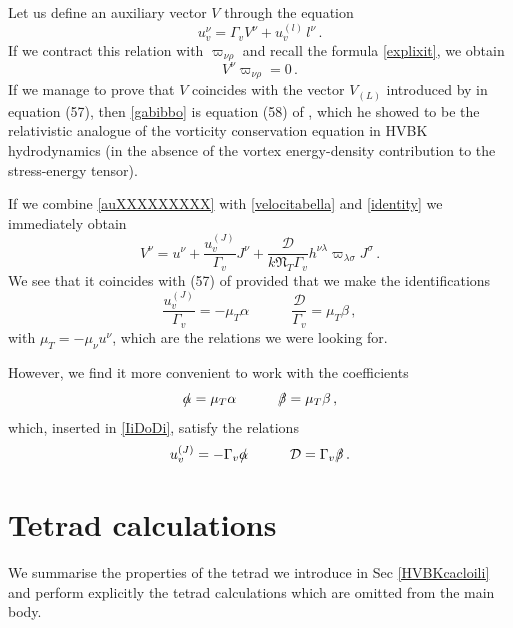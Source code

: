 \documentclass[preprints,article,accept,moreauthors,pdftex]{mdpi}
\newcommand{\spc}{\quad \quad \quad}
\begin{document}
Let us define an auxiliary vector $V$ through the equation
\begin{equation}\label{auXXXXXXXXX}
u_v^\nu = \Gamma_v V^\nu +u_v^{(l)} \, l^\nu \, .
\end{equation}
If we contract this relation with $\varpi_{\nu \rho}$ and recall the formula \eqref{explixit}, we obtain
\begin{equation}\label{gabibbo}
V^\nu \varpi_{\nu \rho} =0 \, .
\end{equation}
If we manage to prove that $V$ coincides with the vector $V_{(L)}$ introduced by \citet{GusakovHVBK} in equation (57), then \eqref{gabibbo} is equation (58) of \cite{GusakovHVBK}, which he showed to be the relativistic analogue of the vorticity conservation equation in HVBK hydrodynamics (in the absence of the vortex energy-density contribution to the stress-energy tensor). 

If we combine \eqref{auXXXXXXXXX} with \eqref{velocitabella} and \eqref{identity} we immediately obtain
\begin{equation}
V^\nu = u^\nu + \dfrac{u_v^{(J)}}{\Gamma_v} J^\nu + \dfrac{\mathcal{D}}{k\mathfrak{N}_T \Gamma_v} h^{\nu \lambda} \varpi_{\lambda \sigma} J^\sigma \, . 
\end{equation}
We see that it coincides with (57) of \cite{GusakovHVBK} provided that we make the identifications
\begin{equation}\label{IiDoDi}
\dfrac{u_v^{(J)}}{\Gamma_v} = - \mu_T  \alpha  \spc   \dfrac{\mathcal{D}}{ \Gamma_v} = \mu_T \beta \, ,
\end{equation}
with $\mu_T =-\mu_\nu u^\nu$, which are the relations we were looking for. 


However, we find it more convenient to work with the coefficients
\begin{equation}
\slashed{\alpha} = \mu_T  \alpha \spc  \slashed{\beta} = \mu_T  \beta \, ,
\end{equation}
which, inserted in \eqref{IiDoDi}, satisfy the relations
\begin{equation}
u_v^{(J)} = - \Gamma_v \slashed{\alpha} \spc  \mathcal{D}=\Gamma_v \slashed{\beta} \, . 
\end{equation}

\section{Tetrad calculations}

We summarise the properties of the tetrad we introduce in Sec \ref{HVBKcacloili} and perform explicitly the tetrad calculations which are omitted from the main body.
\end{document}
